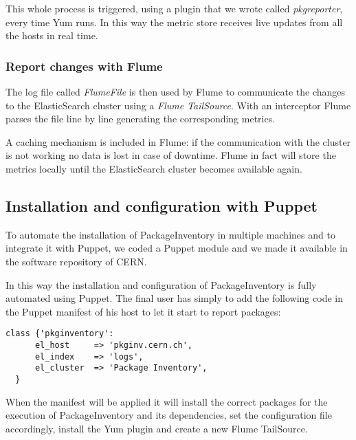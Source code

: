 This whole process is triggered, using a plugin that we wrote called
\textit{pkgreporter}, every time Yum runs. In this way the metric store
receives live updates from all the hosts in real time.

\subsubsection{Report changes with Flume}

The log file called \textit{FlumeFile} is then used by Flume to
communicate the changes to the ElasticSearch cluster using a \textit{Flume
TailSource}. With an interceptor Flume parses the file line by line
generating the corresponding metrics.

A caching mechanism is included in Flume: if the communication with the
cluster is not working no data is lost in case of downtime. Flume in fact
will store the metrics locally until the ElasticSearch cluster becomes
available again.

\subsection{Installation and configuration with Puppet}

To automate the installation of PackageInventory in multiple machines and
to integrate it with Puppet, we coded a Puppet module and we made it
available in the software repository of CERN.

In this way the installation and configuration of PackageInventory is
fully automated using Puppet. The final user has simply to add the
following code in the Puppet manifest of his host to let it start to
report packages: \newline{}

\begin{lstlisting}[frame=single]
  class {'pkginventory':
      el_host     => 'pkginv.cern.ch',
      el_index    => 'logs',
      el_cluster  => 'Package Inventory',
  }
\end{lstlisting}

When the manifest will be applied it will install the correct packages for
the execution of PackageInventory and its dependencies, set the
configuration file accordingly, install the Yum plugin and create a new
Flume TailSource.
